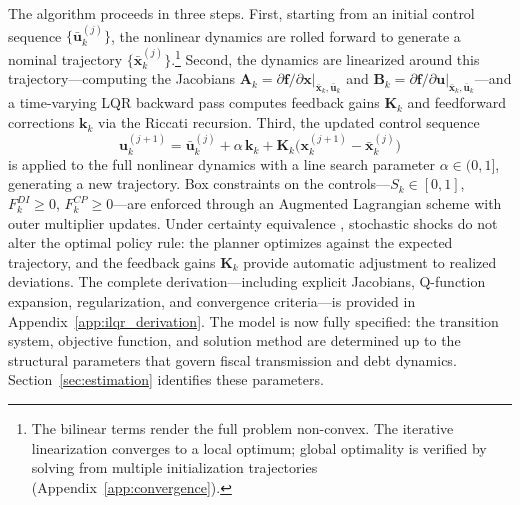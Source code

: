 \documentclass[12pt, a4paper]{article}
\begin{document}
The algorithm proceeds in three steps. First, starting from
an initial control sequence $\{\bar{\bm{u}}_k^{(j)}\}$, the nonlinear dynamics are
rolled forward to generate a nominal trajectory $\{\bar{\bm{x}}_k^{(j)}\}$.\footnote{The bilinear terms render the full problem non-convex. The iterative linearization converges to a local optimum; global optimality is verified by solving from multiple initialization trajectories (Appendix~\ref{app:convergence}).} Second, the dynamics are linearized around this trajectory---computing the Jacobians $\bm{A}_k = \partial \bm{f} / \partial
\bm{x}\big|_{\bar{\bm{x}}_k, \bar{\bm{u}}_k}$ and $\bm{B}_k = \partial \bm{f} /
\partial \bm{u}\big|_{\bar{\bm{x}}_k, \bar{\bm{u}}_k}$---and a time-varying LQR
backward pass computes feedback gains $\bm{K}_k$ and feedforward corrections
$\bm{k}_k$ via the Riccati recursion. Third, the updated control sequence
%
\begin{equation}
    \bm{u}_k^{(j+1)} = \bar{\bm{u}}_k^{(j)} + \alpha\,\bm{k}_k
    + \bm{K}_k\bigl(\bm{x}_k^{(j+1)} - \bar{\bm{x}}_k^{(j)}\bigr)
    \label{eq:fwd_u}
\end{equation}
%
is applied to the full nonlinear dynamics with a line search parameter $\alpha \in (0,1]$, generating a new trajectory. Box constraints on the controls---$S_k \in [0,1]$, $F_k^{DI} \geq 0$, $F_k^{CP} \geq 0$---are enforced through an Augmented Lagrangian scheme \citep{howell2019altro} with outer multiplier updates. Under certainty equivalence \citep[Chapter~3.1]{bertsekas2017dynamic}, stochastic shocks do not alter the optimal policy rule: the planner optimizes against the expected trajectory, and the feedback gains $\bm{K}_k$ provide automatic adjustment to realized deviations. The complete derivation---including explicit Jacobians, Q-function expansion, regularization, and convergence criteria---is provided in Appendix~\ref{app:ilqr_derivation}. The model is now fully specified: the transition system, objective function, and solution method are determined up to the structural parameters that govern fiscal transmission and debt dynamics. Section~\ref{sec:estimation} identifies these parameters.


\end{document}

